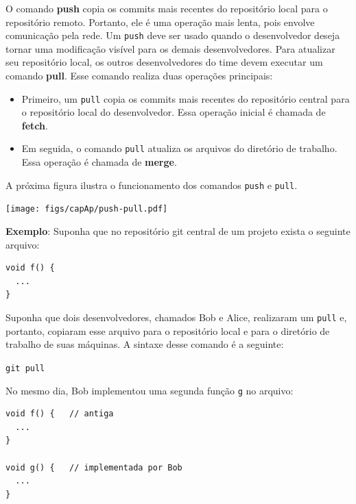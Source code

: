\documentclass[
  11pt,
  twoside]{book}
\newcommand{\passthrough}[1]{#1}
\let\origfigure\figure
\let\endorigfigure\endfigure
\renewenvironment{figure}[1][2] {
    \expandafter\origfigure\expandafter[!h]
} {
    \endorigfigure
}
\begin{document}
  O comando \textbf{push} copia os
commits mais recentes do repositório local para o repositório remoto.
Portanto, ele é uma operação mais lenta, pois envolve comunicação pela
rede. Um \passthrough{\lstinline!push!} deve ser usado quando o
desenvolvedor deseja tornar uma modificação visível para os demais
desenvolvedores. Para atualizar seu repositório local, os outros
desenvolvedores do time devem executar um comando \textbf{pull}. Esse
comando realiza duas operações principais:

\begin{itemize}
\item
  Primeiro, um \passthrough{\lstinline!pull!} copia os commits mais
  recentes do repositório central para o repositório local do
  desenvolvedor. Essa operação inicial é chamada de \textbf{fetch}.
\item
  Em seguida, o comando \passthrough{\lstinline!pull!} atualiza os
  arquivos do diretório de trabalho. Essa operação é chamada de
  \textbf{merge}.
\end{itemize}

A próxima figura ilustra o funcionamento dos comandos
\passthrough{\lstinline!push!} e \passthrough{\lstinline!pull!}.

\begin{figure}
\centering
\texttt{[image: figs/capAp/push-pull.pdf]}
\caption{Comandos \passthrough{\lstinline!push!} e
\passthrough{\lstinline!pull!}}
\end{figure}

\textbf{Exemplo}: Suponha que no repositório git central de um projeto
exista o seguinte arquivo:

\begin{lstlisting}
void f() {
  ... 
}
\end{lstlisting}

Suponha que dois desenvolvedores, chamados Bob e Alice, realizaram um
\passthrough{\lstinline!pull!} e, portanto, copiaram esse arquivo para o
repositório local e para o diretório de trabalho de suas máquinas. A
sintaxe desse comando é a seguinte:

\passthrough{\lstinline!git pull!}

No mesmo dia, Bob implementou uma segunda função
\passthrough{\lstinline!g!} no arquivo:

\begin{lstlisting}
void f() {   // antiga
  ... 
}

void g() {   // implementada por Bob
  ... 
}
\end{lstlisting}
\end{document}
